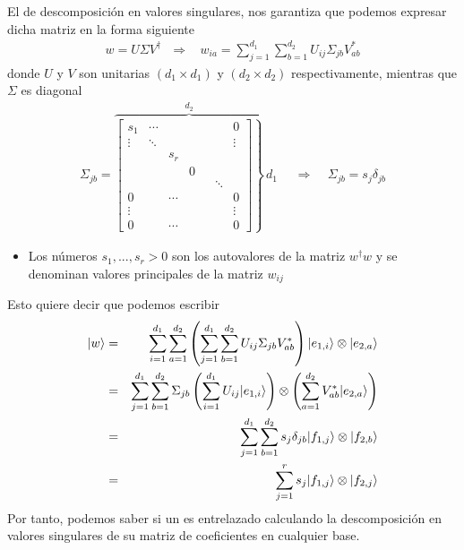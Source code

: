 \documentclass[letterpaper,10pt,english]{jupyterBook}
\newcommand{\ket}[1]{|#1\rangle}
\begin{document}
\sphinxAtStartPar
El  de descomposición en valores singulares, nos garantiza que podemos expresar dicha matriz en la forma siguiente
\begin{equation*}
\begin{split}
w = U\Sigma V^\dagger ~~~\Rightarrow ~~~~w_{ia} = \sum_{j=1}^{d_1}\sum_{b=1}^{d_2} U_{ij}\Sigma_{jb}V_{ab}^*
\end{split}
\end{equation*}
\sphinxAtStartPar
donde \(U\) y \(V\) son unitarias \((d_1\times d_1)\) y \((d_2\times d_2)\) respectivamente, mientras que \(\Sigma\) es diagonal
\begin{equation*}
\begin{split}
\Sigma_{jb} = 
\overbrace{\left.
\begin{bmatrix}
s_1 &\cdots  &    &  & & &  0  \\  \vdots & \ddots & & & & & \vdots  \\  & & s_r & & & &  \\
   & &  & 0  & &  &    \\ & & & & & \ddots &  \\  0 & &\cdots  & & & & 0  \\ \vdots & &&&& & \vdots \\ 0 & & \cdots & & & & 0
\end{bmatrix}   \right\}  }^{\displaystyle d_2} \, d_1 ~~~~~~\Rightarrow ~~~~~ \Sigma_{jb} = s_j\delta_{jb}
\end{split}
\end{equation*}\begin{itemize}
\item {} 
\sphinxAtStartPar
Los números \(s_1,...,s_r >0\) son los autovalores de la matriz \(w^\dagger w\)  y se denominan valores principales   de la matriz \(w_{ij}\)

\end{itemize}

\sphinxAtStartPar
Esto quiere decir que podemos escribir
\begin{eqnarray*}
\ket{w} &=& \sum_{i=1}^{d_1}\sum_{a=1}^{d_2}\left( \sum_{j=1}^{d_1}\sum_{b=1}^{d_2} U_{ij}\Sigma_{jb}V_{ab}^* \right)\ket{e_{1,i}}\otimes \ket{e_{2,a}}
\\  \rule{0mm}{10mm}
&=& \sum_{j=1}^{d_1}\sum_{b=1}^{d_2}\Sigma_{jb}\left( \sum_{i=1}^{d_1} U_{ij}\ket{e_{1,i}} \right)\otimes  \left( \sum_{a=1}^{d_2} V_{ab}^* \ket{e_{2,a}}\right)
\\   \rule{0mm}{10mm}
&=& \sum_{j=1}^{d_1}\sum_{b=1}^{d_2}s_j\delta_{jb} \ket{f_{1,j}}\otimes \ket{f_{2,b}}\\   \rule{0mm}{10mm}
&=& \sum_{j=1}^r s_j \ket{f_{1,j}}\otimes \ket{f_{2,j}}
\end{eqnarray*}
\sphinxAtStartPar
Por tanto, podemos saber si un  es entrelazado calculando la descomposición en valores singulares de su matriz de coeficientes en cualquier base.
\end{document}

